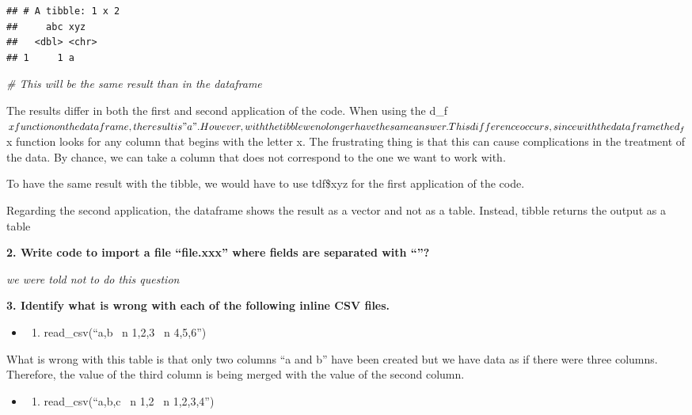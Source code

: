 \documentclass[
]{article}
\newenvironment{Shaded}{\begin{snugshade}}{\end{snugshade}}
\newcommand{\CommentTok}[1]{\textcolor[rgb]{0.56,0.35,0.01}{\textit{#1}}}
\providecommand{\tightlist}{%
  \setlength{\itemsep}{0pt}\setlength{\parskip}{0pt}}
\begin{document}
\begin{verbatim}
## # A tibble: 1 x 2
##     abc xyz  
##   <dbl> <chr>
## 1     1 a
\end{verbatim}

\begin{Shaded}
\begin{Highlighting}[]
\CommentTok{\# This will be the same result than in the dataframe}
\end{Highlighting}
\end{Shaded}

The results differ in both the first and second application of the code.
When using the
d\_f\(x function on the dataframe, the result is "a". However, with the tibble we no longer have the same answer. This difference occurs, since with the dataframe the d_f\)x
function looks for any column that begins with the letter x. The
frustrating thing is that this can cause complications in the treatment
of the data. By chance, we can take a column that does not correspond to
the one we want to work with.

To have the same result with the tibble, we would have to use tdf\$xyz
for the first application of the code.

Regarding the second application, the dataframe shows the result as a
vector and not as a table. Instead, tibble returns the output as a table

\textbf{2. Write code to import a file ``file.xxx'' where fields are
separated with ``\textbar{}''?}

\emph{we were told not to do this question}

\textbf{3. Identify what is wrong with each of the following inline CSV
files.}

\begin{itemize}
\item
  \begin{enumerate}
  \def\labelenumi{\arabic{enumi}.}
  \tightlist
  \item
    read\_csv(``a,b ~n 1,2,3 ~n 4,5,6'')
  \end{enumerate}
\end{itemize}

What is wrong with this table is that only two columns ``a and b'' have
been created but we have data as if there were three columns. Therefore,
the value of the third column is being merged with the value of the
second column.

\begin{itemize}
\item
  \begin{enumerate}
  \def\labelenumi{\arabic{enumi}.}
  \setcounter{enumi}{1}
  \tightlist
  \item
    read\_csv(``a,b,c ~n 1,2 ~n 1,2,3,4'')
  \end{enumerate}
\end{itemize}
\end{document}
